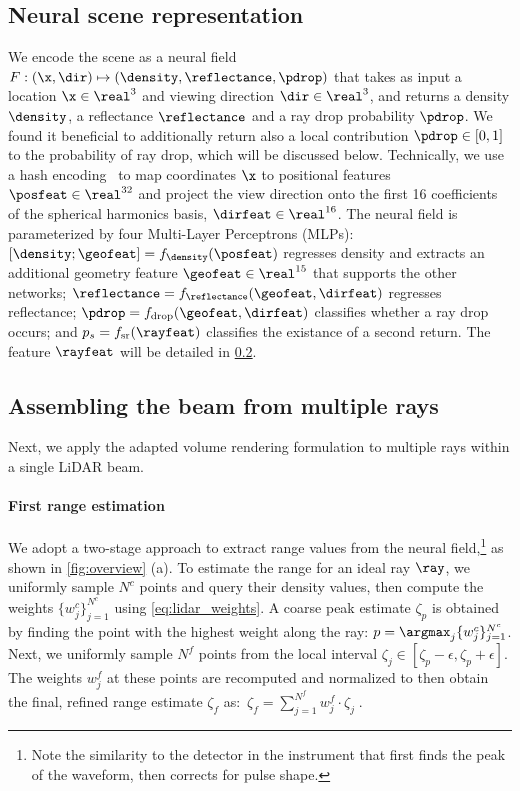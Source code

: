 \subsection{Neural scene representation}\label{sec:neural_scene_rep}
We encode the scene as a neural field $F: (\x, \dir) \mapsto (\density, \reflectance, \pdrop)$ that takes as input a location $\x \in \real^3$ and viewing direction $\dir \in \real^3$, and returns a density $\density$, a reflectance $\reflectance$ and a ray drop probability $\pdrop$. We found it beneficial to additionally return also a local contribution $\pdrop \in [0, 1]$ to the probability of ray drop, which will be discussed below.
Technically, we use a hash encoding~\cite{mueller2022instant} to map coordinates $\x$ to positional features $\posfeat \in \real^{32}$ and project the view direction onto the first 16 coefficients of the spherical harmonics basis, $\dirfeat \in \real^{16}$. The neural field is parameterized by four Multi-Layer Perceptrons (MLPs): $[\density; \geofeat] = f_\density(\posfeat)$ regresses density and extracts an additional geometry feature $\geofeat \in \real^{15}$ that supports the other networks; $\reflectance = f_{\reflectance}(\geofeat, \dirfeat)$ regresses reflectance; $\pdrop = f_{\text{drop}}(\geofeat, \dirfeat)$ classifies whether a ray drop occurs; and  $p_s = f_{\text{sr}}(\rayfeat)$ classifies the existance of a second return. The feature $\rayfeat$ will be detailed in \cref{sec:render_lidar}.





\subsection{Assembling the beam from multiple rays}
\label{sec:render_lidar}
Next, we apply the adapted volume rendering formulation to multiple rays within a single LiDAR beam.


\paragraph{First range estimation}
We adopt a two-stage approach to extract range values from the neural field,\footnote{Note the similarity to the detector in the instrument that first finds the peak of the waveform, then corrects for pulse shape.} as shown in \cref{fig:overview} (a).
To estimate the range for an ideal ray $\ray$, we uniformly sample $N^c$ points and query their density values, then compute the weights $\{w^c_j\}_{j=1}^{N^c}$ using \cref{eq:lidar_weights}. A coarse peak estimate $\zeta_p$ is obtained by finding the point with the highest weight along the ray: $p = \argmax_j \{w^c_j\}_{j=1}^{N^c} $. Next, we uniformly sample $N^f$ points from the local interval $\zeta_j \in [\zeta_p - \epsilon, \zeta_p + \epsilon]$. The weights $w_j^f$ at these points are recomputed and normalized to then obtain the final, refined range estimate $\zeta_f$ as:~$\zeta_f = \sum_{j=1}^{N^f} w^f_j \cdot \zeta_j\;.$




